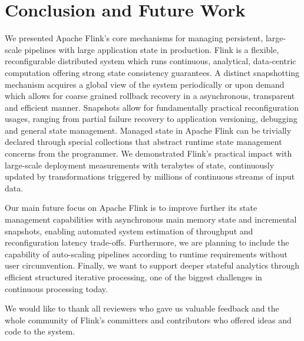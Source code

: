 
\section{Conclusion and Future Work}
\label{sec:conclusion}

We presented Apache Flink's core mechanisms for managing persistent, large-scale pipelines with large application state in production. Flink is a flexible, reconfigurable distributed system which runs continuous, analytical, data-centric computation offering strong state consistency guarantees. A distinct snapshotting mechanism acquires a global view of the system periodically or upon demand which allows for coarse grained rollback recovery in a asynchronous, transparent and efficient manner. Snapshots allow for fundamentally practical reconfiguration usages, ranging from partial failure recovery to application versioning, debugging and general state management. Managed state in Apache Flink can be trivially declared through special collections that abstract runtime state management concerns from the programmer. We demonstrated Flink's practical impact with large-scale deployment measurements with terabytes of state, continuously updated by transformations triggered by millions of continuous streams of input data.

 Our main future focus on Apache Flink is to improve further its state management capabilities with asynchronous main memory state and incremental snapshots, enabling automated system estimation of throughput and reconfiguration latency trade-offs. Furthermore, we are planning to include the capability of auto-scaling pipelines according to runtime requirements without user circumvention. Finally, we want to support deeper stateful analytics through efficient structured iterative processing, one of the biggest challenges in continuous processing today.

 We would like to thank all reviewers who gave us valuable feedback and the whole community of Flink's committers and contributors who offered ideas and code to the system. 
